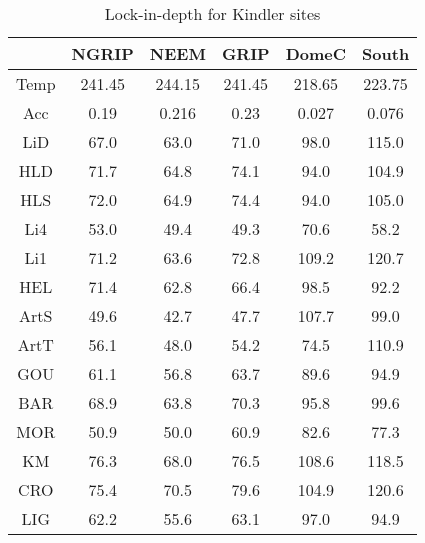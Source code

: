 \begin{table}[h]
\centering
\caption{Lock-in-depth for Kindler sites}
\label{table:5}
\begin{tabular}{cccccc}
\toprule
{} & {NGRIP} & {NEEM} & {GRIP} & {DomeC} & {South} \\
\midrule
Temp & 241.45 & 244.15 & 241.45 & 218.65 & 223.75 \\
Acc & 0.19 & 0.216 & 0.23 & 0.027 & 0.076 \\
LiD & 67.0 & 63.0 & 71.0 & 98.0 & 115.0 \\
HLD & 71.7 & 64.8 & 74.1 & 94.0 & 104.9 \\
HLS & 72.0 & 64.9 & 74.4 & 94.0 & 105.0 \\
Li4 & 53.0 & 49.4 & 49.3 & 70.6 & 58.2 \\
Li1 & 71.2 & 63.6 & 72.8 & 109.2 & 120.7 \\
HEL & 71.4 & 62.8 & 66.4 & 98.5 & 92.2 \\
ArtS & 49.6 & 42.7 & 47.7 & 107.7 & 99.0 \\
ArtT & 56.1 & 48.0 & 54.2 & 74.5 & 110.9 \\
GOU & 61.1 & 56.8 & 63.7 & 89.6 & 94.9 \\
BAR & 68.9 & 63.8 & 70.3 & 95.8 & 99.6 \\
MOR & 50.9 & 50.0 & 60.9 & 82.6 & 77.3 \\
KM & 76.3 & 68.0 & 76.5 & 108.6 & 118.5 \\
CRO & 75.4 & 70.5 & 79.6 & 104.9 & 120.6 \\
LIG & 62.2 & 55.6 & 63.1 & 97.0 & 94.9 \\
\bottomrule
\end{tabular}
\end{table}
